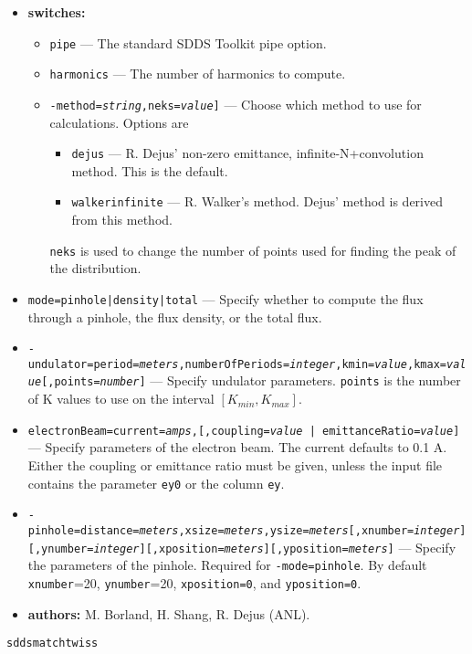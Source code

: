 \documentclass[11pt]{article}
\begin{document}
\begin{itemize}
\item {\bf switches:}
\begin{itemize}
\item {\tt pipe} --- The standard SDDS Toolkit pipe option.
\item {\tt harmonics} --- The number of harmonics to compute.
\item {\tt -method={\em string},neks={\em value}]} --- Choose which method to
 use for calculations.   Options are
 \begin{itemize} 
 \item {\tt dejus} --- R. Dejus' non-zero emittance, infinite-N+convolution method.  This is the
   default.
 \item {\tt walkerinfinite} --- R. Walker's method.  Dejus' method is derived from this method.
 \end{itemize}
 {\tt neks} is used to  change the number of points used for finding the peak of the distribution.
\end{itemize}
\item {\tt mode={pinhole|density|total}} --- Specify whether to compute the flux through a pinhole, the flux density,
  or the total flux.
\item {\tt -undulator=period={\em meters},numberOfPeriods={\em integer},kmin={\em value},kmax={\em value}[,points={\em number}]} ---
  Specify undulator parameters.  {\tt points} is the number of K values to use on the interval $[K_{min}, K_{max}]$.
\item {\tt electronBeam=current={\em amps},[,{coupling={\em value} | emittanceRatio={\em value}}]} --- Specify parameters of the
  electron beam.  The current defaults to 0.1 A.  Either the coupling or emittance ratio must be given, unless the input file
  contains the parameter {\tt ey0} or the column {\tt ey}.
\item {\tt -pinhole=distance={\em meters},xsize={\em meters},ysize={\em meters}}{\tt [,xnumber={\em integer}]}\\
  {\tt [,ynumber={\em integer}]}{\tt [,xposition={\em meters}]}{\tt [,yposition={\em meters}]} ---
  Specify the parameters of the pinhole.  Required for {\tt -mode=pinhole}.  By default {\tt xnumber}=20, {\tt ynumber}=20, 
  {\tt xposition=0}, and {\tt yposition=0}.
\item {\bf authors:} M. Borland, H. Shang, R. Dejus (ANL).
\end{itemize}

\newpage
\begin{center}{\Large\verb|sddsmatchtwiss|}\end{center}
\end{document}
